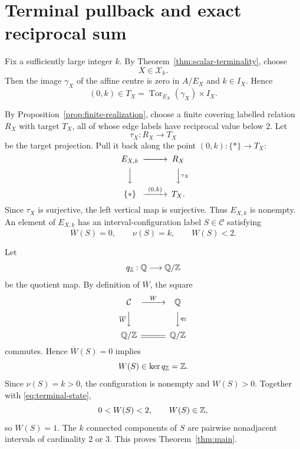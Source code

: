 \section{Terminal pullback and exact reciprocal sum}
\label{sec:terminalization}

Fix a sufficiently large integer $k$.  By Theorem~\ref{thm:scalar-terminality}, choose
\[
X\in\mathcal X_k.
\]
Then the image $\gamma_X$ of the affine centre is zero in $A/E_X$ and $k\in I_X$.  Hence
\[
(0,k)\in T_X
=\operatorname{Tor}_{E_X}(\gamma_X)\times I_X.
\]

By Proposition~\ref{prop:finite-realization}, choose a finite covering labelled relation $R_X$ with target $T_X$, all of whose edge labels have reciprocal value below $2$.  Let
\[
\tau_X:R_X\longrightarrow T_X
\]
be the target projection.  Pull it back along the point $(0,k):\{*\}\to T_X$:
\begin{equation}\label{eq:terminal-edge-pullback}
\begin{CD}
E_{X,k} @>>> R_X\\
@VVV @VV{\tau_X}V\\
\{*\} @>{(0,k)}>> T_X .
\end{CD}
\end{equation}
Since $\tau_X$ is surjective, the left vertical map is surjective.  Thus $E_{X,k}$ is nonempty.  An element of $E_{X,k}$ has an interval-configuration label $S\in\mathcal C$ satisfying
\begin{equation}\label{eq:terminal-state}
\overline W(S)=0,
\qquad
\nu(S)=k,
\qquad
W(S)<2.
\end{equation}

Let
\[
q_{\mathbb Z}:\mathbb Q\longrightarrow\mathbb Q/\mathbb Z
\]
be the quotient map.  By definition of $\overline W$, the square
\begin{equation}\label{eq:value-residue-square}
\begin{CD}
\mathcal C @>{W}>> \Q\\
@V{\overline W}VV @VV{q_{\Z}}V\\
\Q/\Z @= \Q/\Z
\end{CD}
\end{equation}
commutes.  Hence $\overline W(S)=0$ implies
\[
W(S)\in\ker q_{\mathbb Z}=\mathbb Z.
\]
Since $\nu(S)=k>0$, the configuration is nonempty and $W(S)>0$.  Together with \eqref{eq:terminal-state},
\[
0<W(S)<2,
\qquad
W(S)\in\mathbb Z,
\]
so $W(S)=1$.  The $k$ connected components of $S$ are pairwise nonadjacent intervals of cardinality $2$ or $3$.  This proves Theorem~\ref{thm:main}.
